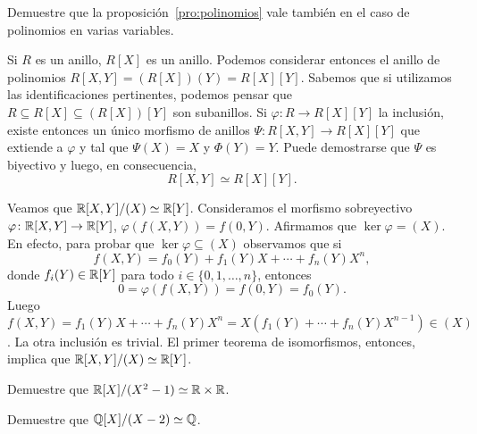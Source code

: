 \begin{exercise}
Demuestre que 
la proposición~\ref{pro:polinomios} vale también en el caso de polinomios en varias variables.
\end{exercise} 


\begin{example}
Si $R$ es un anillo, $R[X]$ es un anillo. Podemos considerar entonces el anillo de polinomios $R[X,Y]=(R[X])(Y)=R[X][Y]$. 
Sabemos que si utilizamos las identificaciones pertinentes, podemos pensar que $R\subseteq R[X]\subseteq (R[X])[Y]$ son subanillos. Si 
	$\varphi\colon R\to R[X][Y]$ la inclusión, existe entonces un único morfismo de anillos $\Psi\colon R[X,Y]\to R[X][Y]$ que extiende a $\varphi$ y tal que
	$\Psi(X)=X$ y $\Phi(Y)=Y$. Puede demostrarse que $\Psi$ es biyectivo y luego, en consecuencia,
	\[
R[X,Y]\simeq R[X][Y].
\]
\end{example}

\begin{example}
Veamos que $\mathbb{R}[X,Y]/(X)\simeq\mathbb{R}[Y]$. Consideramos el morfismo sobreyectivo $\varphi\colon\mathbb{R}[X,Y]\to\mathbb{R}[Y]$, $\varphi(f(X,Y))=f(0,Y)$. Afirmamos
que $\ker\varphi=(X)$. En efecto, para probar que $\ker\varphi\subseteq (X)$ observamos que si
\[
f(X,Y)=f_0(Y)+f_1(Y)X+\cdots+f_n(Y)X^n,
\]
donde $f_i(Y)\in\mathbb{R}[Y]$ para todo $i\in\{0,1,\dots,n\}$, entonces 
\[
0=\varphi(f(X,Y))=f(0,Y)=f_0(Y).
\] 
Luego $f(X,Y)=f_1(Y)X+\cdots+f_n(Y)X^n=X(f_1(Y)+\cdots+f_n(Y)X^{n-1})\in (X)$. La otra inclusión es trivial. 
El primer teorema de isomorfismos, entonces, implica que $\mathbb{R}[X,Y]/(X)\simeq\mathbb{R}[Y]$.  
\end{example}

\begin{exercise}
Demuestre que $\mathbb{R}[X]/(X^2-1)\simeq\mathbb{R}\times\mathbb{R}$.	
\end{exercise}

\begin{exercise}
Demuestre que $\mathbb{Q}[X]/(X-2)\simeq\mathbb{Q}$. 	
\end{exercise}
	
